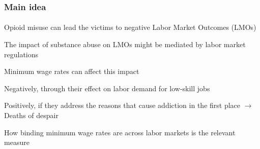\begin{frame}

    \label{main_idea}
    \frametitle{Main idea} %
    \framesubtitle{}  %
    \rmfamily %
    
    \begin{wideitemize}
        \item Opioid misuse can lead the victims to negative Labor Market Outcomes (\textcolor{fblu}{LMOs})
        \item The impact of substance abuse on LMOs might be mediated by labor market regulations
        \item \textcolor{fblu}{Minimum wage rates} can affect this impact 
        \vspace{9pt}
        \begin{wideitemize}
            \item[\textcolor{fblu}{\textbullet}] Negatively, through their effect on \textcolor{fblu}{labor demand} for low-skill jobs %
            \item[\textcolor{fblu}{\textbullet}] Positively, if they address the reasons that cause addiction in the first place \(\to\) \textcolor{fblu}{Deaths of despair}
        \end{wideitemize}
        \item How \textcolor{fblu}{binding} minimum wage rates are across labor markets is the relevant measure
    \end{wideitemize}

    \hyperlink{min_wage_plot}{}
    \hyperlink{min_wage_plot_allstates}{}

\end{frame}

